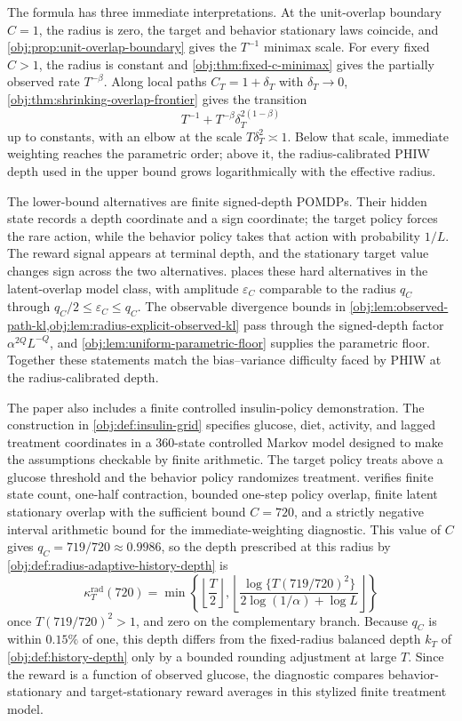 \documentclass[11pt]{article}
\begin{document}
The formula has three immediate interpretations. At the unit-overlap boundary \(C=1\), the radius is zero, the target and behavior stationary laws coincide, and \cref{obj:prop:unit-overlap-boundary} gives the \(T^{-1}\) minimax scale. For every fixed \(C>1\), the radius is constant and \cref{obj:thm:fixed-c-minimax} gives the partially observed rate \(T^{-\beta}\). Along local paths \(C_T=1+\delta_T\) with \(\delta_T\to0\), \cref{obj:thm:shrinking-overlap-frontier} gives the transition
\[
T^{-1}+T^{-\beta}\delta_T^{2(1-\beta)}
\]
up to constants, with an elbow at the scale \(T\delta_T^2\asymp 1\). Below that scale, immediate weighting reaches the parametric order; above it, the radius-calibrated PHIW depth used in the upper bound grows logarithmically with the effective radius.

The lower-bound alternatives are finite signed-depth POMDPs. Their hidden state records a depth coordinate and a sign coordinate; the target policy forces the rare action, while the behavior policy takes that action with probability \(1/L\). The reward signal appears at terminal depth, and the stationary target value changes sign across the two alternatives.  places these hard alternatives in the latent-overlap model class, with amplitude \(\varepsilon_C\) comparable to the radius \(q_C\) through \(q_C/2\le\varepsilon_C\le q_C\). The observable divergence bounds in \cref{obj:lem:observed-path-kl,obj:lem:radius-explicit-observed-kl} pass through the signed-depth factor \(\alpha^{2Q}L^{-Q}\), and \cref{obj:lem:uniform-parametric-floor} supplies the parametric floor. Together these statements match the bias--variance difficulty faced by PHIW at the radius-calibrated depth.

The paper also includes a finite controlled insulin-policy demonstration. The construction in \cref{obj:def:insulin-grid} specifies glucose, diet, activity, and lagged treatment coordinates in a 360-state controlled Markov model designed to make the assumptions checkable by finite arithmetic. The target policy treats above a glucose threshold and the behavior policy randomizes treatment.  verifies finite state count, one-half contraction, bounded one-step policy overlap, finite latent stationary overlap with the sufficient bound \(C=720\), and a strictly negative interval arithmetic bound for the immediate-weighting diagnostic. This value of \(C\) gives \(q_C=719/720\approx0.9986\), so the depth prescribed at this radius by \cref{obj:def:radius-adaptive-history-depth} is
\[
\kappa_T^{\mathrm{rad}}(720)
=
\min\left\{
\left\lfloor\frac{T}{2}\right\rfloor,
\left\lfloor\frac{\log\{T(719/720)^2\}}{2\log(1/\alpha)+\log L}\right\rfloor
\right\}
\]
once \(T(719/720)^2>1\), and zero on the complementary branch. Because \(q_C\) is within \(0.15\%\) of one, this depth differs from the fixed-radius balanced depth \(k_T\) of \cref{obj:def:history-depth} only by a bounded rounding adjustment at large \(T\). Since the reward is a function of observed glucose, the diagnostic compares behavior-stationary and target-stationary reward averages in this stylized finite treatment model.
\end{document}
